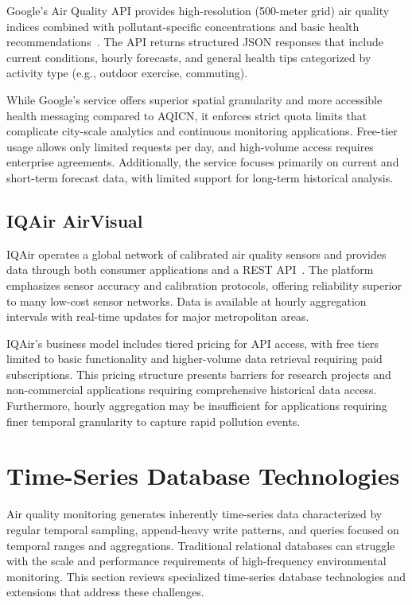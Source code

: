 Google's Air Quality API provides high-resolution (500-meter grid) air quality indices combined with pollutant-specific concentrations and basic health recommendations~\citep{google}. The API returns structured JSON responses that include current conditions, hourly forecasts, and general health tips categorized by activity type (e.g., outdoor exercise, commuting).

While Google's service offers superior spatial granularity and more accessible health messaging compared to AQICN, it enforces strict quota limits that complicate city-scale analytics and continuous monitoring applications. Free-tier usage allows only limited requests per day, and high-volume access requires enterprise agreements. Additionally, the service focuses primarily on current and short-term forecast data, with limited support for long-term historical analysis.

\subsection{IQAir AirVisual}
\label{subsec:lit_iqair}

IQAir operates a global network of calibrated air quality sensors and provides data through both consumer applications and a REST API~\citep{iqairapi}. The platform emphasizes sensor accuracy and calibration protocols, offering reliability superior to many low-cost sensor networks. Data is available at hourly aggregation intervals with real-time updates for major metropolitan areas.

IQAir's business model includes tiered pricing for API access, with free tiers limited to basic functionality and higher-volume data retrieval requiring paid subscriptions. This pricing structure presents barriers for research projects and non-commercial applications requiring comprehensive historical data access. Furthermore, hourly aggregation may be insufficient for applications requiring finer temporal granularity to capture rapid pollution events.

\section{Time-Series Database Technologies}
\label{sec:lit_tsdb}

Air quality monitoring generates inherently time-series data characterized by regular temporal sampling, append-heavy write patterns, and queries focused on temporal ranges and aggregations. Traditional relational databases can struggle with the scale and performance requirements of high-frequency environmental monitoring. This section reviews specialized time-series database technologies and extensions that address these challenges.

